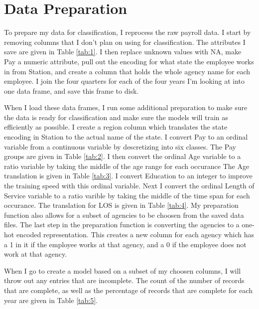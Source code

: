 \documentclass{article}
\begin{document}
\section{Data Preparation}
To prepare my data for classification, I reprocess the raw payroll data. I start by removing columns that I don't plan on using for classification. The attributes I save are given in Table \ref{tab:1}. I then replace unknown values with NA, make Pay a numeric attribute, pull out the encoding for what state the employee works in from Station, and create a column that holds the whole agency name for each employee. I join the four quarters for each of the four years I'm looking at into one data frame, and save this frame to disk.
\par
When I load these data frames, I run some additional preparation to make sure the data is ready for classification and make sure the models will train as efficiently as possible. I create a region column which translates the state encoding in Station to the actual name of the state. I convert Pay to an ordinal variable from a continuous variable by descretizing into six classes. The Pay groups are given in Table \ref{tab:2}. I then convert the ordinal Age variable to a ratio variable by taking the middle of the age range for each occurance The Age translation is given in Table \ref{tab:3}. I convert Education to an integer to improve the training speed with this ordinal variable. Next I convert the ordinal Length of Service variable to a ratio varible by taking the middle of the time span for each occurance. The translation for LOS is given in Table \ref{tab:4}. My preparation function also allows for a subset of agencies to be choosen from the saved data files. The last step in the preparation function is converting the agencies to a one-hot encoded representation. This creates a new column for each agency which has a 1 in it if the employee works at that agency, and a 0 if the employee does not work at that agency.
\par
When I go to create a model based on a subset of my choosen columns, I will throw out any entries that are incomplete. The count of the number of records that are complete, as well as the percentage of records that are complete for each year are given in Table \ref{tab:5}.
\end{document}
